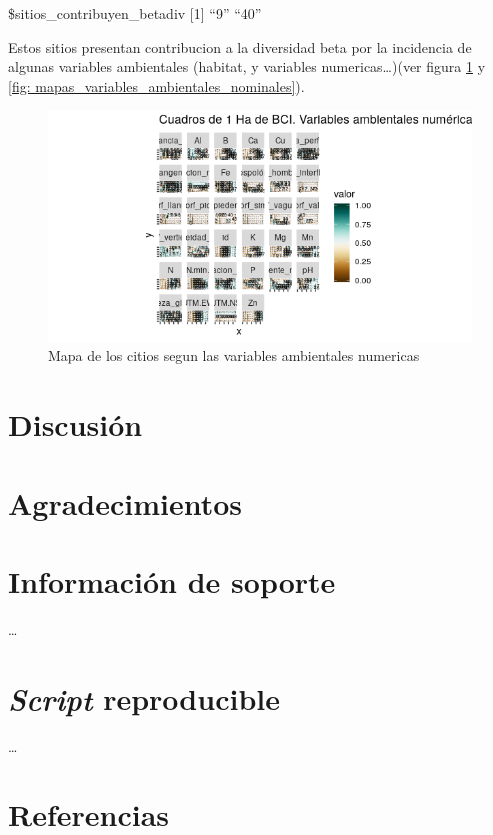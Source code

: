 \documentclass[11pt,]{article}
\begin{document}
{{\$sitios\_contribuyen\_betadiv {[}1{]} ``9'' ``40''

Estos sitios presentan contribucion a la diversidad beta por la
incidencia de algunas variables ambientales (habitat, y variables
numericas\ldots{})(ver figura \ref{fig:Sitios_variables_ambientales} y
\ref{fig: mapas_variables_ambientales_nominales}).

\begin{figure}
\centering
\includegraphics[width=1.00000\textwidth]{Sitios_variables_ambientales.png}
\caption{Mapa de los citios segun las variables ambientales numericas
\label{fig:Sitios_variables_ambientales}}
\end{figure}

\section{Discusión}\label{discusiuxf3n}

\section{Agradecimientos}\label{agradecimientos}

\section{Información de soporte}\label{informaciuxf3n-de-soporte}

\ldots

\section{\texorpdfstring{\emph{Script}
reproducible}{Script reproducible}}\label{script-reproducible}

\ldots

\section*{Referencias}\label{referencias}

}}
\end{document}
